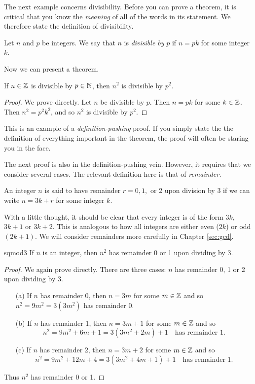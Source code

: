 The next example concerns divisibility. Before you can prove a theorem, it is critical that you know the \emph{meaning} of all of the words in its statement. We therefore state the definition of divisibility.

\begin{defn}{}{}
Let $n$ and $p$ be integers. We say that $n$ is \emph{divisible by} $p$ if $n=pk$ for some integer $k$.
\end{defn}

 Now we can present a theorem.

\begin{thm}{}{}
If $n\in\mathbb{Z}$ is divisible by $p\in\mathbb{N}$, then $n^2$ is divisible by $p^2$.
\end{thm}

\begin{proof}
We prove directly. Let $n$ be divisible by $p$. Then $n=pk$ for some $k\in\mathbb{Z}$. Then $n^2=p^2k^2$, and so $n^2$ is divisible by $p^2$.
\end{proof}

 This is an example of a \emph{definition-pushing} proof. If you simply state the the definition of everything important in the theorem, the proof will often be staring you in the face.


The next proof is also in the definition-pushing vein. However, it requires that we consider several cases. The relevant definition here is that of \emph{remainder.}

\begin{defn}{}{}
An integer $n$ is said to have remainder $r=0,1,$ or 2 upon division by 3 if we can write $n=3k+r$ for some integer $k$.
\end{defn}

 With a little thought, it should be clear that every integer is of the form $3k$, $3k+1$ or $3k+2$. This is analogous to how all integers are either even ($2k$) or odd $(2k+1)$. We will consider remainders more carefully in Chapter \ref{sec:gcd}.

\begin{thm}{}{sqmod3}
If $n$ is an integer, then $n^2$ has remainder 0 or 1 upon dividing by 3.
\end{thm}

\begin{proof}
We again prove directly. There are three cases: $n$ has remainder 0, 1 or 2 upon dividing by 3.
\begin{enumerate}
  \item[(a)] If $n$ has remainder 0, then $n=3m$ for some $m\in\mathbb{Z}$ and so $n^2=9m^2=3(3m^2)$ has remainder 0.
  \item[(b)] If $n$ has remainder 1, then $n=3m+1$ for some $m\in\mathbb{Z}$ and so
  \[n^2=9m^2+6m+1=3(3m^2+2m)+1\quad\text{has remainder 1.}\]
  \item[(c)] If $n$ has remainder 2, then $n=3m+2$ for some $m\in\mathbb{Z}$ and so
  \[n^2=9m^2+12m+4=3(3m^2+4m+1)+1\quad\text{has remainder 1.}\]
\end{enumerate}
Thus $n^2$ has remainder 0 or 1.
\end{proof}

